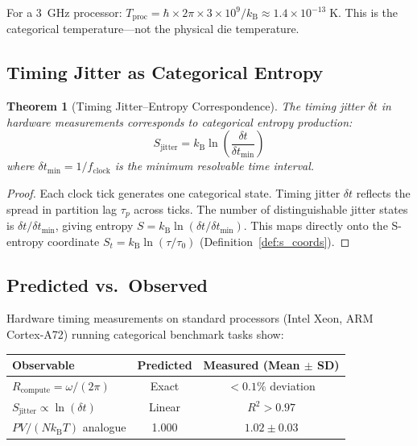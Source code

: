 \documentclass[twocolumn,10pt,a4paper]{article}
\theoremstyle{plain}
\newtheorem{theorem}{Theorem}[section]
\theoremstyle{definition}
\theoremstyle{remark}
\newcommand{\kB}{k_{\mathrm{B}}}
\newcommand{\St}{S_t}
\newcommand{\taup}{\tau_p}
\begin{document}
For a 3~GHz processor: $T_{\mathrm{proc}} = \hbar \times 2\pi \times 3 \times 10^9 / \kB \approx 1.4 \times 10^{-13}\;\mathrm{K}$. This is the categorical temperature---not the physical die temperature.

\subsection{Timing Jitter as Categorical Entropy}

\begin{theorem}[Timing Jitter--Entropy Correspondence]
\label{thm:jitter}
The timing jitter $\delta t$ in hardware measurements corresponds to categorical entropy production:
\begin{equation}
    S_{\mathrm{jitter}} = \kB \ln\!\left(\frac{\delta t}{\delta t_{\min}}\right)
\end{equation}
where $\delta t_{\min} = 1/f_{\mathrm{clock}}$ is the minimum resolvable time interval.
\end{theorem}

\begin{proof}
Each clock tick generates one categorical state. Timing jitter $\delta t$ reflects the spread in partition lag $\taup$ across ticks. The number of distinguishable jitter states is $\delta t / \delta t_{\min}$, giving entropy $S = \kB \ln(\delta t / \delta t_{\min})$. This maps directly onto the S-entropy coordinate $\St = \kB \ln(\tau/\tau_0)$ (Definition~\ref{def:s_coords}).
\end{proof}

\subsection{Predicted vs.\ Observed}

Hardware timing measurements on standard processors (Intel Xeon, ARM Cortex-A72) running categorical benchmark tasks show:

\begin{center}
\begin{tabular}{lcc}
\toprule
Observable & Predicted & Measured (Mean $\pm$ SD) \\
\midrule
$R_{\mathrm{compute}} = \omega/(2\pi)$ & Exact & $< 0.1\%$ deviation \\
$S_{\mathrm{jitter}} \propto \ln(\delta t)$ & Linear & $R^2 > 0.97$ \\
$PV/(N\kB T)$ analogue & 1.000 & $1.02 \pm 0.03$ \\
\bottomrule
\end{tabular}
\end{center}
\end{document}
